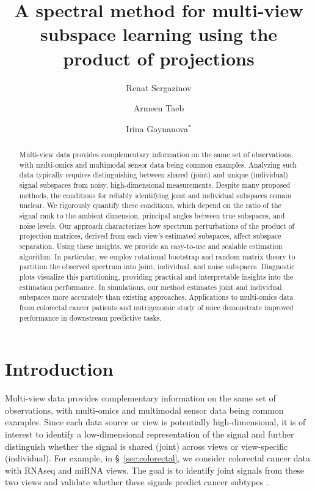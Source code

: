 \documentclass{amsart}
\title{A spectral method for multi-view subspace learning using the product of projections}
\author{Renat Sergazinov}
\author{Armeen Taeb}
\author{Irina Gaynanova$^{*}$}
\begin{document}
\maketitle

\begin{abstract}

Multi-view data provides complementary information on the same set of observations, with multi-omics and multimodal sensor data being common examples. Analyzing such data typically requires distinguishing between shared (joint) and unique (individual) signal subspaces from noisy, high-dimensional measurements. Despite many proposed methods, the conditions for reliably identifying joint and individual subspaces remain unclear. We rigorously quantify these conditions, which depend on the ratio of the signal rank to the ambient dimension, principal angles between true subspaces, and noise levels. Our approach characterizes how spectrum perturbations of the product of projection matrices, derived from each view’s estimated subspaces, affect subspace separation. Using these insights, we provide an easy-to-use and scalable estimation algorithm. In particular, we employ rotational bootstrap and random matrix theory to partition the observed spectrum into joint, individual, and noise subspaces. Diagnostic plots visualize this partitioning, providing practical and interpretable insights into the estimation performance. In simulations, our method estimates joint and individual subspaces more accurately than existing approaches. Applications to multi-omics data from colorectal cancer patients and nutrigenomic study of mice demonstrate improved performance in downstream predictive tasks.
\end{abstract}


\section{Introduction}

Multi-view data provides complementary information on the same set of observations, with multi-omics and multimodal sensor data being common examples. Since each data source or view is potentially high-dimensional, it is of interest to identify a low-dimensional representation of the signal and further distinguish whether the signal is shared (joint) across views or view-specific (individual). For example, in \S~\ref{sec:colorectal}, we consider colorectal cancer data with RNAseq and miRNA views. The goal is to identify joint signals from these two views and validate whether these signals predict cancer subtypes \citep{guinney2015consensus}.
\end{document}

